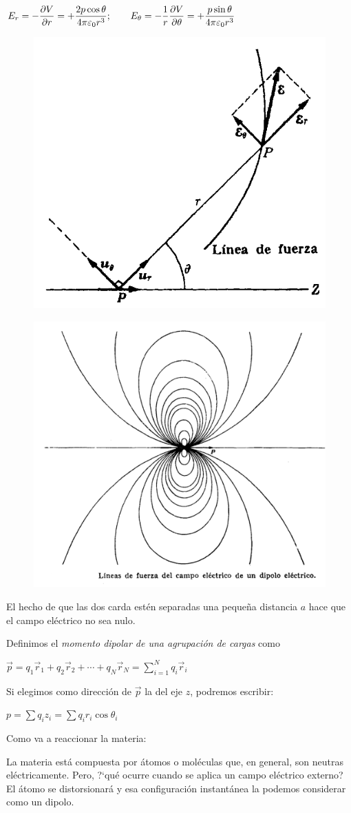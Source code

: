 $\displaystyle E_r=-\pdv{V}{r}= +\dfrac{2p\cos \theta}{4 \pi \varepsilon_0 r^3}; \qquad E_\theta=-\dfrac 1 r \pdv{V}{\theta}= +\dfrac{p\sin \theta}{4 \pi \varepsilon_0 r^3}$
\begin{multicols}{2}
\begin{figure}[H]
	\centering
	\includegraphics[width=.5\textwidth]{imagenes/imagenes24/T24IM03.png}
\end{figure}
\begin{figure}[H]
	\centering
	\includegraphics[width=.5\textwidth]{imagenes/imagenes24/T24IM04.png}
\end{figure}
\end{multicols}
El hecho de que las dos carda estén separadas una pequeña distancia $a$ hace que el campo eléctrico no sea nulo.

Definimos el \emph{momento dipolar de una agrupación de cargas} como 

$\displaystyle \vec p= q_1 \vec r_1+ q_2 \vec r_2+ \cdots + q_N \vec r_N = \sum_{i=1}^N q_i \vec r_i$

Si elegimos como dirección de $\vec p$ la del eje $z$, podremos escribir: 

$p=\sum q_iz_i=\sum q_ir_i \cos \theta_i$ 


Como va a reaccionar la materia:

La materia está compuesta por átomos o moléculas que, en general, son neutras eléctricamente. Pero, ?`qué ocurre cuando se aplica un campo eléctrico externo? El átomo se distorsionará y esa configuración instantánea la podemos considerar como un dipolo.

